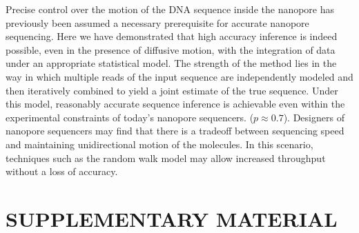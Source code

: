 \documentclass{biophys_letter}
\begin{document}


Precise control over the motion of the DNA sequence inside the nanopore has previously been assumed a necessary prerequisite for accurate nanopore sequencing.
Here we have demonstrated that high accuracy inference is indeed possible, even in the presence of diffusive motion, with the integration of data under an appropriate statistical model. 
The strength of the method lies in the way in which multiple reads of the input sequence are independently modeled and then iteratively combined to yield a joint estimate of the true sequence.
Under this model, reasonably accurate sequence inference is achievable even within the experimental constraints of today's nanopore sequencers. ($p \approx 0.7$).
Designers of nanopore sequencers may find that there is a tradeoff between sequencing speed and maintaining unidirectional motion of the molecules.
In this scenario, techniques such as the random walk model may allow increased throughput without a loss of accuracy.

\section*{SUPPLEMENTARY MATERIAL}
\end{document}

